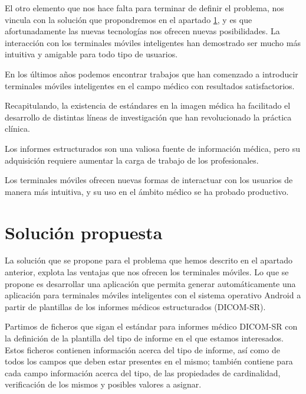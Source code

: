 El otro elemento que nos hace falta para terminar de definir el problema, nos vincula con la solución que propondremos en el apartado \ref{solucion}, y es que afortunadamente las nuevas tecnologías nos ofrecen nuevas posibilidades. La interacción con los terminales móviles inteligentes han demostrado ser mucho más intuitiva y amigable para todo tipo de usuarios.\par
En los últimos años podemos encontrar trabajos que han comenzado a introducir terminales móviles inteligentes en el campo médico con resultados satisfactorios. \cite{journals/jdi/ChoudhriR11,20359897,journals/jdi/TangLLC04}\bigskip\par

Recapitulando, la existencia de estándares en la imagen médica ha facilitado el desarrollo de distintas líneas de investigación que han revolucionado la práctica clínica. \par
Los informes estructurados son una valiosa fuente de información médica, pero su adquisición requiere aumentar la carga de trabajo de los profesionales. \par
Los terminales móviles ofrecen nuevas formas de interactuar con los usuarios de manera más intuitiva, y su uso en el ámbito médico se ha probado productivo. \par


\section{Solución propuesta}\label{solucion}
La solución que se propone para el problema que hemos descrito en el apartado anterior, explota las ventajas que nos ofrecen los terminales móviles. Lo que se propone es desarrollar una aplicación que permita generar automáticamente una aplicación para terminales móviles inteligentes con el sistema operativo Android a partir de plantillas de los informes médicos estructurados (DICOM-SR).\medskip\par

Partimos de ficheros que sigan el estándar para informes médico DICOM-SR con la definición de la plantilla del tipo de informe en el que estamos interesados. Estos ficheros contienen información  acerca del tipo de informe, así como de todos los campos que deben estar presentes en el mismo; también contiene para cada campo información acerca del tipo, de las propiedades de cardinalidad, verificación de los mismos y posibles valores a asignar.\par

